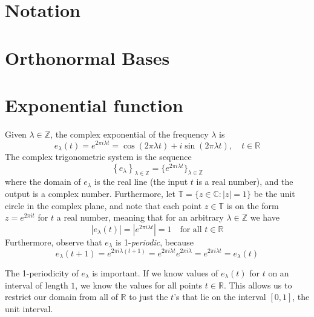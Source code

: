 \documentclass[../thesis.tex]{subfiles}
\begin{document}
\section{Notation}
    

\section{Orthonormal Bases}


\section{Exponential function}
Given $\lambda \in \mathbb{Z}$, the complex exponential of the frequency $\lambda$ is 
\begin{equation}
    e_{\lambda}(t) = e^{2 \pi i \lambda t} = \cos{(2 \pi \lambda t)} + i \sin{(2 \pi \lambda t)}, \quad t\in \mathbb{R}    
\end{equation}
The complex trigonometric system is the sequence
\begin{equation}
    \left\{ e_{\lambda} \right\}_{\lambda\in \mathbb{Z}} = \{ e^{2 \pi i \lambda t} \}_{\lambda \in \mathbb{Z}}    
\end{equation}
where the domain of $e_\lambda$ is the real line (the input $t$ is a real number), and the output is a complex number. Furthermore, let $\mathbb{T}=\{z\in \mathbb{C} : |z|=1\}$ be the unit circle in the complex plane, and note that each point $z\in\mathbb{T}$ is on the form $z=e^{2 \pi i t}$ for $t$ a real number, meaning that for an arbitrary $\lambda \in \mathbb{Z}$ we have
\begin{equation}
    \left|e_{\lambda}(t) \right|= |e^{2 \pi i \lambda t} | = 1 \quad \text{for all } t\in \mathbb{R} 
\end{equation}
Furthermore, observe that $e_\lambda$ is 1-\emph{periodic}, because
\begin{equation}
    e_\lambda(t+1) = e^{2 \pi i \lambda (t+1)} = e^{2 \pi i \lambda t} e^{2 \pi i \lambda} = e^{2 \pi i \lambda t} = e_\lambda(t)
\end{equation}

The 1-periodicity of $e_\lambda$ is important. If we know values of $e_\lambda(t)$ for $t$ on an interval of length $1$, we know the values for all points $t\in \mathbb{R}$. This allows us to restrict our domain from all of $\mathbb{R}$ to just the $t$'s that lie on the interval $[0,1]$, the unit interval.
\end{document}
